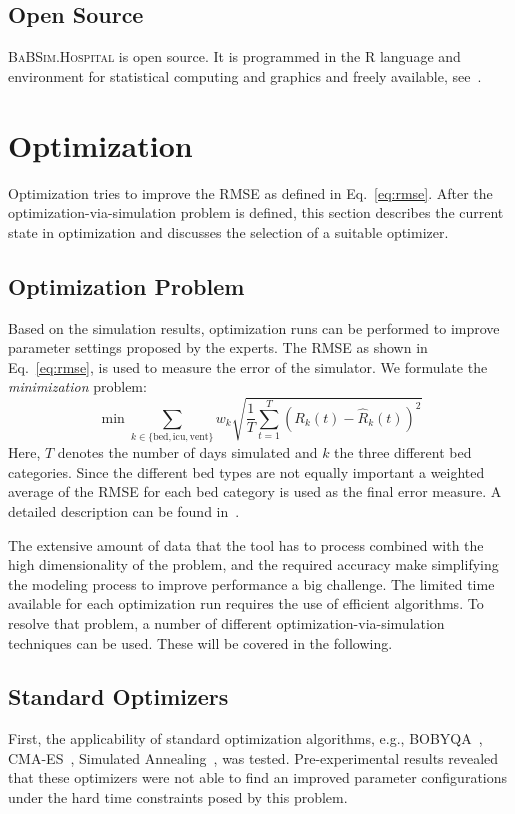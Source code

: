 \documentclass[conference]{IEEEtran}
\newcommand{\babsimhospital}{\textsc{BaBSim.Hospital}\xspace}
\begin{document}
\subsection{Open Source}
\babsimhospital is open source. It is programmed in the R language and environment for statistical computing and graphics and freely available, see~\cite{bart20t}.


\section{Optimization}\label{sec:optim}
Optimization tries to improve the \gls{RMSE} as defined in Eq.~\ref{eq:rmse}.
After the optimization-via-simulation problem is defined, this section describes the current state in optimization and discusses the selection of a suitable optimizer. 

\subsection{Optimization Problem}
Based on the simulation results, optimization runs can be performed to improve parameter settings proposed by the experts. 
The \gls{RMSE} as shown in Eq.~\ref{eq:rmse}, is used to measure the error of the simulator.
We formulate the \emph{minimization} problem:
\begin{equation}\label{eq:rmse}
  \min 
  \sum_{k\in\{\text{bed},\text{icu},\text{vent}\}}
    w_k  \sqrt{\frac{1}{T} \sum_{t=1}^T \left(R_k(t) - \hat{R}_k(t)\right)^2}
\end{equation}
Here, $T$ denotes the number of days simulated and $k$ the three different bed categories.
Since the different bed types are not equally important a weighted average of the \gls{RMSE} for each bed category is used as the final error measure.
A detailed description can be found in~\citep{Bart20j}.

The extensive amount of data that the tool has to process combined with the high dimensionality of the problem, and the required accuracy make simplifying the modeling process to improve performance a big challenge.
The limited time available for each optimization run requires the use of efficient algorithms.
To resolve that problem, a number of different optimization-via-simulation techniques can be used. 
These will be covered in the following.

\subsection{Standard Optimizers}
First, the applicability of standard optimization algorithms, e.g., BOBYQA~\citep{Powe09a}, CMA-ES~\citep{Hans06a}, Simulated Annealing~\citep{vanL87a}, was tested. Pre-experimental results revealed that these optimizers were not able to find an improved parameter configurations under the hard time constraints posed by this problem. 
\end{document}
